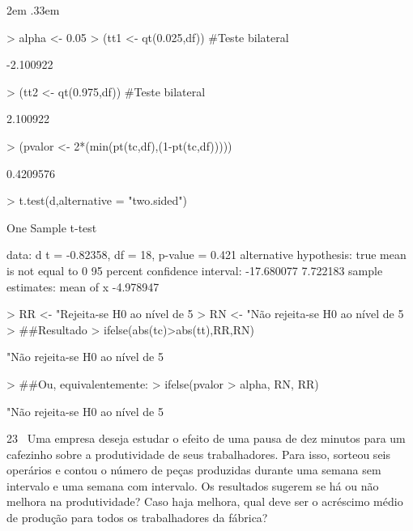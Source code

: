 \documentclass{article}
\newenvironment{ManualExercise}
  {\begin{list}{}{\leftmargin \QuestionIndent
    \partopsep0pt \parsep\parskip \topsep\QuestionBefore
    \itemsep\QuestionBefore \labelwidth2em
    \labelsep.33em
    \usecounter{Question}}}
  {\end{list}}
\begin{document}
\begin{Exercise}
\begin{ManualExercise}
\begin{Schunk}
\begin{Sinput}
> alpha <- 0.05
> (tt1 <- qt(0.025,df)) #Teste bilateral
\end{Sinput}
\begin{Soutput}
[1] -2.100922
\end{Soutput}
\begin{Sinput}
> (tt2 <- qt(0.975,df)) #Teste bilateral
\end{Sinput}
\begin{Soutput}
[1] 2.100922
\end{Soutput}
\begin{Sinput}
> (pvalor <- 2*(min(pt(tc,df),(1-pt(tc,df)))))
\end{Sinput}
\begin{Soutput}
[1] 0.4209576
\end{Soutput}
\begin{Sinput}
> t.test(d,alternative = "two.sided")
\end{Sinput}
\begin{Soutput}
	One Sample t-test

data:  d
t = -0.82358, df = 18, p-value = 0.421
alternative hypothesis: true mean is not equal to 0
95 percent confidence interval:
 -17.680077   7.722183
sample estimates:
mean of x 
-4.978947 
\end{Soutput}
\begin{Sinput}
> RR <- "Rejeita-se H0 ao nível de 5%
> RN <- "Não rejeita-se H0 ao nível de 5%
> ##Resultado
> ifelse(abs(tc)>abs(tt),RR,RN)
\end{Sinput}
\begin{Soutput}
[1] "Não rejeita-se H0 ao nível de 5%
\end{Soutput}
\begin{Sinput}
> ##Ou, equivalentemente:
> ifelse(pvalor > alpha, RN, RR)
\end{Sinput}
\begin{Soutput}
[1] "Não rejeita-se H0 ao nível de 5%
\end{Soutput}
\end{Schunk}

\item[23~]Uma empresa deseja estudar o efeito de uma pausa de dez minutos para um cafezinho sobre a produtividade de seus trabalhadores. Para isso, sorteou seis operários e contou o número de peças produzidas durante uma semana sem intervalo e uma semana com intervalo. Os resultados sugerem se há ou não melhora na produtividade? 
Caso haja melhora, qual deve ser o acréscimo médio de produção para todos os trabalhadores da fábrica?


\end{ManualExercise}
\end{Exercise}
\end{document}
